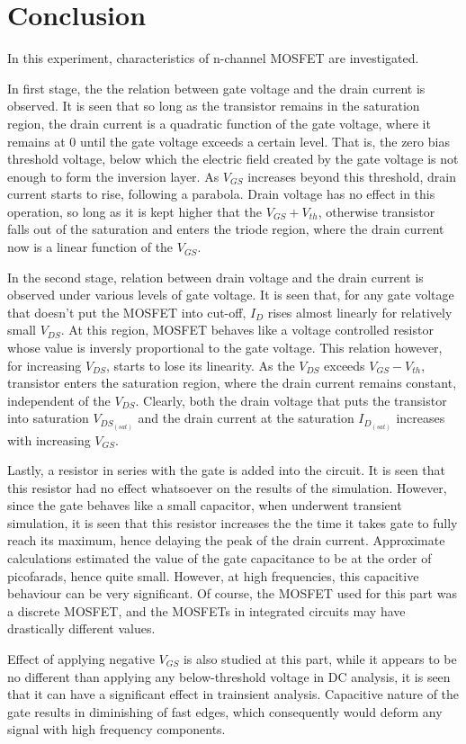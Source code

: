 \documentclass[../main.tex]{subfiles}
\begin{document}
\section{Conclusion}

    In this experiment, characteristics of n-channel MOSFET are investigated. 
    
    In first stage, the the relation between gate voltage and the drain current is observed. It is 
    seen that so long as the transistor remains in the saturation region, the drain current is a 
    quadratic function of the gate voltage, where it remains at 0 until the gate voltage exceeds a 
    certain level. That is, the zero bias threshold voltage, below which the electric field created 
    by the gate voltage is not enough to form the inversion layer. As $V_{GS}$ increases beyond this
    threshold, drain current starts to rise, following a parabola. Drain voltage has no effect in 
    this operation, so long as it is kept higher that the $V_{GS}+V_{th}$, otherwise transistor falls 
    out of the saturation and enters the triode region, where the drain current now is a linear function
    of the $V_{GS}$.

    In the second stage, relation between drain voltage and the drain current is observed under 
    various levels of gate voltage. It is seen that, for any gate voltage that doesn't put the 
    MOSFET into cut-off, $I_D$ rises almost linearly for relatively small $V_{DS}$. At this region,
    MOSFET behaves like a voltage controlled resistor whose value is inversly proportional to the 
    gate voltage. This relation however, for increasing $V_{DS}$, starts to lose its linearity.
    As the $V_{DS}$ exceeds $V_{GS}-V_{th}$, transistor enters the saturation region, where the 
    drain current remains constant, independent of the $V_{DS}$. Clearly, both the drain voltage 
    that puts the transistor into saturation $V_{DS_{(sat)}}$ and the drain current at the 
    saturation $I_{D_{(sat)}}$ increases with increasing $V_{GS}$.

    Lastly, a resistor in series with the gate is added into the circuit. It is seen that this resistor 
    had no effect whatsoever on the results of the simulation. However, since the gate behaves like a 
    small capacitor, when underwent transient simulation, it is seen that this resistor increases the 
    the time it takes gate to fully reach its maximum, hence delaying the peak of the drain current. 
    Approximate calculations estimated the value of the gate capacitance to be at the order of picofarads,
    hence quite small. However, at high frequencies, this capacitive behaviour can be very significant. 
    Of course, the MOSFET used for this part was a discrete MOSFET, and the MOSFETs in integrated 
    circuits may have drastically different values. 

    Effect of applying negative $V_{GS}$ is also studied at this part, while it appears to be no different 
    than applying any below-threshold voltage in DC analysis, it is seen that it can have a significant 
    effect in trainsient analysis. Capacitive nature of the gate results in diminishing of fast edges, 
    which consequently would deform any signal with high frequency components.
\end{document}
